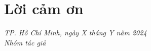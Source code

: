\chapter*{\centering\Large{Lời cảm ơn}}

\blindtext

\begin{flushright}
\textit {TP. Hồ Chí Minh, ngày X tháng Y năm 2024} \\
\textit {Nhóm tác giả}
\end{flushright}

